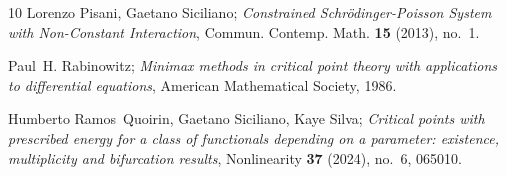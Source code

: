 \documentclass[reqno]{amsart}
\begin{document}
\begin{thebibliography}{10}
 Lorenzo Pisani, Gaetano Siciliano;
\emph{{C}onstrained {S}chr\"odinger-{P}oisson {S}ystem with
 {N}on-{C}onstant {I}nteraction}, Commun. Contemp. Math. \textbf{15} (2013),
 no.~1.

 Paul~H. Rabinowitz;
\emph{Minimax methods in critical point theory with
 applications to differential equations}, American Mathematical Society, 1986.

 Humberto Ramos~Quoirin, Gaetano Siciliano, Kaye Silva;
\emph{Critical points with prescribed energy for a class of functionals depending on a
 parameter: existence, multiplicity and bifurcation results}, Nonlinearity
 \textbf{37} (2024), no.~6, 065010.

\end{thebibliography}
\end{document}
